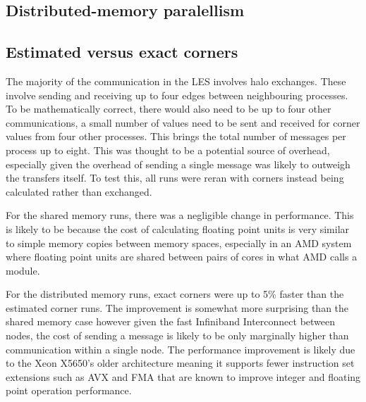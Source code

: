 \subsection{Distributed-memory paralellism}


\subsection{Estimated versus exact corners}

The majority of the communication in the LES involves halo exchanges. These
involve sending and receiving up to four edges between neighbouring processes.
To be mathematically correct, there would also need to be up to four other
communications, a small number of values need to be sent and received for corner
values from four other processes. This brings the total number of messages per
process up to eight. This was thought to be a potential source of overhead,
especially given the overhead of sending a single message was likely to outweigh
the transfers itself. To test this, all runs were reran with corners instead
being calculated rather than exchanged.

For the shared memory runs, there was a negligible change in performance. This
is likely to be because the cost of calculating floating point units is very
similar to simple memory copies between memory spaces, especially in an AMD
system where floating point units are shared between pairs of cores in what AMD
calls a module.

For the distributed memory runs, exact corners were up to 5\% faster than the
estimated corner runs. The improvement is somewhat more surprising than the
shared memory case however given the fast Infiniband Interconnect between nodes,
the cost of sending a message is likely to be only marginally higher than
communication within a single node. The performance improvement is likely due to
the Xeon X5650's older architecture meaning it supports fewer instruction set
extensions such as AVX and FMA that are known to improve integer and floating
point operation performance.
